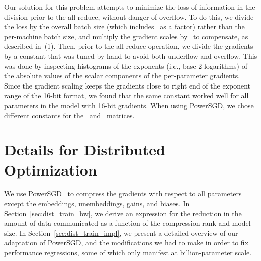 \documentclass{article}
\begin{document}
\begin{enumerate}
    Our solution for this problem attempts to minimize the loss of information in the division prior to the all-reduce, without danger of overflow. To do this, we divide the loss by the overall batch size (which includes~ as a factor) rather than the per-machine batch size, and multiply the gradient scales by~ to compensate, as described in~(1). Then, prior to the all-reduce operation, we divide the gradients by a constant that was tuned by hand to avoid both underflow and overflow. This was done by inspecting histograms of the exponents (i.e., base-2 logarithms) of the absolute values of the scalar components of the per-parameter gradients. Since the gradient scaling keeps the gradients close to right end of the exponent range of the 16-bit format, we found that the same constant worked well for all parameters in the model with 16-bit gradients. When using PowerSGD, we chose different constants for the~ and~ matrices.
\end{enumerate}

\section{Details for Distributed Optimization}

We use PowerSGD~\cite{vogels2019powersgd} to compress the gradients with respect to all parameters except the embeddings, unembeddings, gains, and biases. In Section~\ref{sec:dist_train_bw}, we derive an expression for the reduction in the amount of data communicated as a function of the compression rank and model size. In Section~\ref{sec:dist_train_impl}, we present a detailed overview of our adaptation of PowerSGD, and the modifications we had to make in order to fix performance regressions, some of which only manifest at billion-parameter scale.
\end{document}
